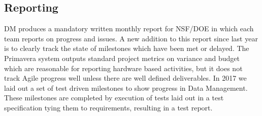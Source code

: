 \subsection{Reporting}
DM produces a mandatory written monthly report for NSF/DOE in which each team reports on progress and issues. A new addition to this report since last year is to clearly track the state of milestones which have been met or delayed.
The Primavera \cite{2016SPIE.9911E..0NK} system outputs standard project metrics on variance and budget which are
reasonable  for reporting hardware based activities, but it does not track  Agile progress well  unless there are well defined deliverables.
In 2017 we laid out a set of test driven milestones to show progress in Data Management.\cite{LDM-503}
These milestones are completed by execution of tests laid out in a test specification tying them to requirements, resulting in a test report.
